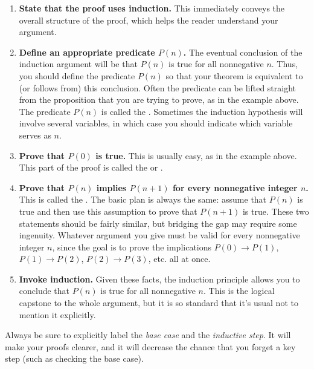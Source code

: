 \begin{enumerate}

\item \textbf{State that the proof uses induction.}  This immediately
conveys the overall structure of the proof, which helps the reader
understand your argument.

\item \textbf{Define an appropriate predicate $P(n)$.}  The eventual
  conclusion of the induction argument will be that $P(n)$ is true for all
  nonnegative $n$.  Thus, you should define the predicate $P(n)$ so that
  your theorem is equivalent to (or follows from) this conclusion.  Often
  the predicate can be lifted straight from the proposition that you
  are trying to prove, as in the example
  above.  The predicate $P(n)$ is called the .
  Sometimes the induction hypothesis will involve several variables, in
  which case you should indicate which variable serves as $n$.

\item \textbf{Prove that $P(0)$ is true.}  This is usually easy, as in the
  example above.  This part of the proof is called the 
  or .\iffalse
  (Sometimes the base case will be $n=1$ or even
  some larger number, in which case the starting value of $n$ also should
  be stated.)\fi


\item \textbf{Prove that $P(n)$ implies $P(n+1)$ for every nonnegative
    integer $n$.}  This is called the .  The basic
  plan is always the same: assume that $P(n)$ is true and then use this
  assumption to prove that $P(n+1)$ is true.  These two statements should
  be fairly similar, but bridging the gap may require some ingenuity.
  Whatever argument you give must be valid for every nonnegative integer
  $n$, since the goal is to prove the implications $P(0) \rightarrow
  P(1)$, $P(1) \rightarrow P(2)$, $P(2) \rightarrow P(3)$, etc. all at
  once.

\item \textbf{Invoke induction.}  Given these facts, the induction
  principle allows you to conclude that $P(n)$ is true for all nonnegative
  $n$.  This is the logical capstone to the whole argument, but it is so
  standard that it's usual not to mention it explicitly.

\end{enumerate}
%
Always be sure to 
explicitly label the \emph{base case} and the \emph{inductive step}.
It will make your proofs clearer, and it will decrease the chance that
you forget a key step (such as checking the base case).

